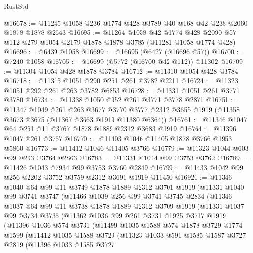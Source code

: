 \begin{lexlean}{RustStd}
\begin{coremodule}
@16678 := @11245 @1058 @236 @1774 @428 @3789 @40 @168 @42 @238 @2060 @1878 @1878 @2643
@16695 := @11264
    @1058
    @42
    @1774
    @428
    @2090
    @57
    @112
    @279
    @1054
    @2179
    @1878
    @1878
    @3785
    (@11281 @1058 @1774 @428)
@16696 := @6439 @1058
@16699 := @16695 (@6427 (@16696 @57))
@16700 := @7240 @1058
@16705 := @16699 (@5772 (@16700 @42 @112)) @11302
@16709 := @11304 @1054 @428 @1878 @3784
@16712 := @11310 @1054 @428 @3784
@16718 := @11315 @1051 @290 @261 @261 @3782 @2211
@16724 := @11323 @1051 @292 @261 @263 @3782 @6853
@16728 := @11331 @1051 @261 @3771 @3780
@16734 := @11338 @1050 @952 @261 @3771 @3778 @2871
@16751 := @11347
    @1049
    @261
    @263
    @3677
    @3770
    @3777
    @2312
    @3655
    @1919
    (@11358 @3673 @3675 (@11367 @3663 @1919 @11380 @6364))
@16761 := @11346 @1047 @64 @261 @11 @3767 @1878 @1889 @2312 @3683 @1919
@16764 := @11396 @1047 @261 @3767
@16770 := @11403 @1046 @11405 @1878 @3766 @1953 @5860
@16773 := @11412 @1046 @11405 @3766
@16779 := @11323 @1044 @603 @99 @263 @3764 @2863
@16783 := @11331 @1044 @99 @3753 @3762
@16789 := @11426 @1043 @7934 @99 @3753 @3760 @2849
@16799 := @11433 @1042 @99 @256 @2202 @3752 @3759 @2312 @3691 @1919 @11450
@16920 := @11346
    @1040
    @64
    @99
    @11
    @3749
    @1878
    @1889
    @2312
    @3701
    @1919
    (@11331
      @1040
      @99
      @3741
      @3747
      (@11466
        @1039
        @256
        @99
        @3741
        @3745
        @2834
        (@11346
          @1037
          @64
          @99
          @11
          @3738
          @1878
          @1889
          @2312
          @3709
          @1919
          (@11331
            @1037
            @99
            @3734
            @3736
            (@11362
              @1036
              @99
              @261
              @3731
              @1925
              @3717
              @1919
              (@11396
                @1036
                @574
                @3731
                (@11499
                  @1035
                  @1588
                  @574
                  @1878
                  @3729
                  @1774
                  @1599
                  (@11412
                    @1035
                    @1588
                    @3729
                    (@11323
                      @1033
                      @591
                      @1585
                      @1587
                      @3727
                      @2819
                      (@11396
                        @1033
                        @1585
                        @3727

\end{coremodule}
\end{lexlean}
